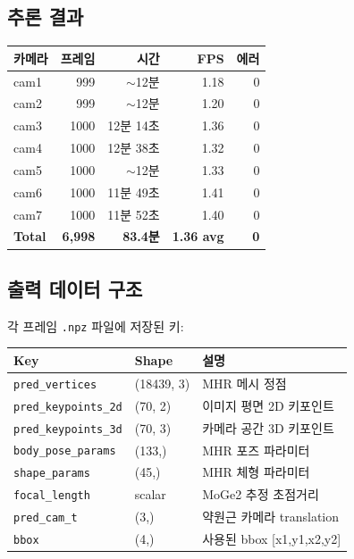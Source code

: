 \documentclass[11pt, a4paper]{article}
\begin{document}
\subsection{추론 결과}

\begin{center}
\begin{tabular}{l r r r r}
\toprule
\textbf{카메라} & \textbf{프레임} & \textbf{시간} & \textbf{FPS} & \textbf{에러} \\
\midrule
cam1 & 999 & $\sim$12분 & 1.18 & 0 \\
cam2 & 999 & $\sim$12분 & 1.20 & 0 \\
cam3 & 1000 & 12분 14초 & 1.36 & 0 \\
cam4 & 1000 & 12분 38초 & 1.32 & 0 \\
cam5 & 1000 & $\sim$12분 & 1.33 & 0 \\
cam6 & 1000 & 11분 49초 & 1.41 & 0 \\
cam7 & 1000 & 11분 52초 & 1.40 & 0 \\
\midrule
\textbf{Total} & \textbf{6,998} & \textbf{83.4분} & \textbf{1.36 avg} & \textbf{0} \\
\bottomrule
\end{tabular}
\end{center}

\subsection{출력 데이터 구조}

각 프레임 \texttt{.npz} 파일에 저장된 키:

\begin{center}
\begin{tabular}{l l l}
\toprule
\textbf{Key} & \textbf{Shape} & \textbf{설명} \\
\midrule
\texttt{pred\_vertices} & (18439, 3) & MHR 메시 정점 \\
\texttt{pred\_keypoints\_2d} & (70, 2) & 이미지 평면 2D 키포인트 \\
\texttt{pred\_keypoints\_3d} & (70, 3) & 카메라 공간 3D 키포인트 \\
\texttt{body\_pose\_params} & (133,) & MHR 포즈 파라미터 \\
\texttt{shape\_params} & (45,) & MHR 체형 파라미터 \\
\texttt{focal\_length} & scalar & MoGe2 추정 초점거리 \\
\texttt{pred\_cam\_t} & (3,) & 약원근 카메라 translation \\
\texttt{bbox} & (4,) & 사용된 bbox [x1,y1,x2,y2] \\
\bottomrule
\end{tabular}
\end{center}
\end{document}
